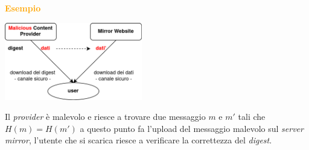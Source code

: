 \begin{boxA}
    \textcolor{orange}{\textbf{Esempio}}

    \medskip

    {\centering
        \includegraphics[width=0.45\textwidth]{img/hash_es_2.png}
    \par}

    Il \textit{provider} è malevolo e riesce a trovare due messaggio $m$ e $m'$ tali che $H(m) = H(m')$ a questo punto fa l'upload del messaggio malevolo sul \textit{server mirror}, l'utente che si scarica riesce a verificare la correttezza del \textit{digest}.
\end{boxA}

